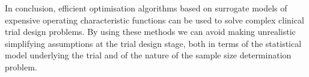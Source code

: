 \documentclass{article} %
\begin{document}
In conclusion, efficient optimisation algorithms based on surrogate models of expensive operating characteristic functions can be used to solve complex clinical trial design problems. By using these methods we can avoid making unrealistic simplifying assumptions at the trial design stage, both in terms of the statistical model underlying the trial and of the nature of the sample size determination problem.



\end{document}
